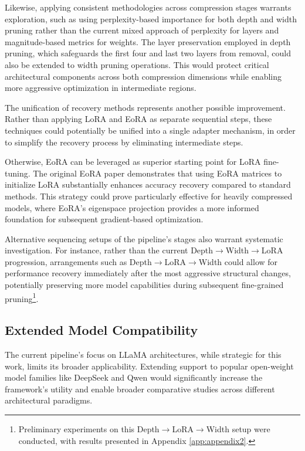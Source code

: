 Likewise, applying consistent methodologies across compression stages warrants exploration, such as using perplexity-based importance for both depth and width pruning rather than the current mixed approach of perplexity for layers and magnitude-based metrics for weights. The layer preservation employed in depth pruning, which safeguards the first four and last two layers from removal, could also be extended to width pruning operations. This would protect critical architectural components across both compression dimensions while enabling more aggressive optimization in intermediate regions.

The unification of recovery methods represents another possible improvement. Rather than applying LoRA and EoRA as separate sequential steps, these techniques could potentially be unified into a single adapter mechanism, in order to simplify the recovery process by eliminating intermediate steps.

Otherwise, EoRA can be leveraged as superior starting point for LoRA fine-tuning. The original EoRA paper \cite{eora} demonstrates that using EoRA matrices to initialize LoRA substantially enhances accuracy recovery compared to standard methods. This strategy could prove particularly effective for heavily compressed models, where EoRA's eigenspace projection provides a more informed foundation for subsequent gradient-based optimization.

Alternative sequencing setups of the pipeline's stages also warrant systematic investigation. For instance, rather than the current Depth$\rightarrow$Width$\rightarrow$LoRA progression, arrangements such as Depth$\rightarrow$LoRA$\rightarrow$Width could allow for performance recovery immediately after the most aggressive structural changes, potentially preserving more model capabilities during subsequent fine-grained pruning\footnote{Preliminary experiments on this Depth$\rightarrow$LoRA$\rightarrow$Width setup were conducted, with results presented in Appendix \ref{app:appendix2}.}.

\subsection{Extended Model Compatibility}
The current pipeline's focus on LLaMA architectures, while strategic for this work, limits its broader applicability. Extending support to popular open-weight model families like DeepSeek \cite{deepseek} and Qwen \cite{qwen} would significantly increase the framework's utility and enable broader comparative studies across different architectural paradigms.

